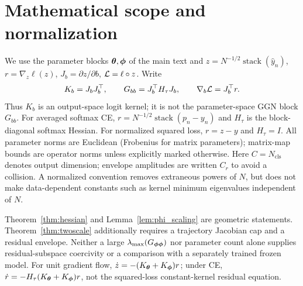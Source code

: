 
\section{Mathematical scope and normalization}
\label{sec:astra_math}
We use the parameter blocks ${\boldsymbol{\theta}},{\boldsymbol{\phi}}$ of the main text and
$z=N^{-1/2}\operatorname{stack}(\hat y_n)$, $r=\nabla_z\ell(z)$,
$J_b=\partial z/\partial b$, $\mathcal{L}=\ell\circ z$. Write
\[
 K_b=J_bJ_b^\top,\qquad G_{bb}=J_b^\top H_\tau J_b,
 \qquad \nabla_b\mathcal{L}=J_b^\top r.
\]
Thus $K_b$ is an output-space logit kernel; it is not the parameter-space
GGN block $G_{bb}$. For averaged softmax CE,
$r=N^{-1/2}\operatorname{stack}(p_n-y_n)$ and $H_\tau$ is the block-diagonal
softmax Hessian. For normalized squared loss, $r=z-y$ and $H_\tau=I$.
All parameter norms are Euclidean (Frobenius for matrix parameters);
matrix-map bounds are operator norms unless explicitly marked otherwise.
Here $C=N_{\mathrm{cls}}$ denotes output dimension; envelope amplitudes
are written $C_r$ to avoid a collision. A normalized convention removes
extraneous powers of $N$, but does not make data-dependent constants
such as kernel minimum eigenvalues independent of $N$.

Theorem~\ref{thm:hessian} and Lemma~\ref{lem:phi_scaling} are geometric
statements. Theorem~\ref{thm:twoscale} additionally requires a trajectory
Jacobian cap and a residual envelope. Neither a large
$\lambda_{\max}(G_{{\boldsymbol{\phi}}{\boldsymbol{\phi}}})$ nor parameter count alone supplies
residual-subspace coercivity or a comparison with a separately trained
frozen model. For unit gradient flow, $\dot z=-(K_{\boldsymbol{\theta}}+K_{\boldsymbol{\phi}})r$;
under CE, $\dot r=-H_\tau(K_{\boldsymbol{\theta}}+K_{\boldsymbol{\phi}})r$, not the squared-loss
constant-kernel residual equation.

